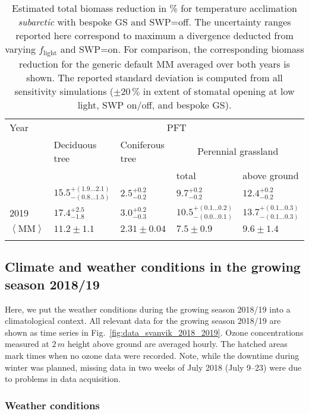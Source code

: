 \documentclass[bg, manuscript]{copernicus}
\begin{document}
\begin{table}[t]
  \caption{Estimated total biomass reduction in \unit{\%} for temperature acclimation \emph{subarctic} with bespoke GS and SWP=off. The uncertainty ranges reported here correspond to maximum a divergence deducted from varying $f_\mathrm{light}$ and SWP=on. For comparison, the corresponding biomass reduction for the generic default MM averaged over both years is shown. The reported standard deviation is computed from all sensitivity simulations ($\pm 20\,\unit{\%}$ in extent of stomatal opening at low light, SWP on/off, and bespoke GS).}
  \label{tab:biomass_reduction}
\begin{tabular}{lllll}
\tophline
Year & \multicolumn{4}{c}{PFT}\\
& Deciduous tree& Coniferous tree & \multicolumn{2}{c}{Perennial grassland}\\
& & & total & above ground\\
\middlehline
2018 & $15.5^{+(1.9...2.1)}_{-(0.8...1.5)}$ & $2.5^{+0.2}_{-0.2}$ & $9.7^{+0.2}_{-0.2}$ & $12.4^{+0.2}_{-0.2}$\\
2019 & $17.4^{+2.5}_{-1.8}$ & $3.0^{+0.2}_{-0.3}$ & $10.5^{+(0.1...0.2)}_{-(0.0...0.1)}$ & $13.7^{+(0.1...0.3)}_{-(0.1...0.3)}$\\
\middlehline
$\left<\mathrm{MM}\right>$ & $11.2\pm 1.1$ & $2.31\pm 0.04$ & $7.5\pm 0.9$ & $9.6\pm 1.4$\\
\bottomhline
\end{tabular}
\end{table}

\subsection{Climate and weather conditions in the growing season 2018/19}
\label{sec:stats}
Here, we put the weather conditions during the growing season 2018/19 into a climatological context. All relevant data for the growing season 2018/19 are shown as time series in Fig.~\ref{fig:data_svanvik_2018_2019}. Ozone concentrations measured at $2\,\unit{m}$ height above ground are averaged hourly. The hatched areas mark times when no ozone data were recorded. Note, while the downtime during winter was planned, missing data in two weeks of July 2018 (July 9--23) were due to problems in data acquisition.

\subsubsection{Weather conditions}
\label{subsec:weather}
\end{document}
